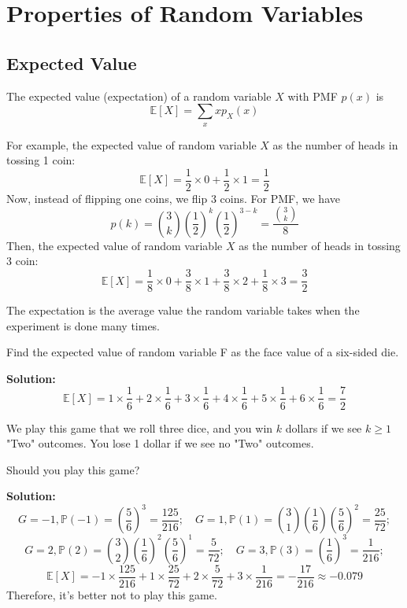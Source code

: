 \section{Properties of Random Variables}

\subsection{Expected Value}
\begin{definition}
  The expected value (expectation) of a random variable \(X\) with PMF \(p(x)\) is 
  \[
    \mathbb{E}[X] = \sum_{x} xp_X (x)
  \]
\end{definition}

For example, the expected value of random variable \(X\) as the number of heads in tossing 1 coin:
\[
  \mathbb{E}[X] = \dfrac{1}{2} \times 0 + \dfrac{1}{2} \times 1 = \dfrac{1}{2}
\]
Now, instead of flipping one coins, we flip 3 coins. For PMF, we have 
\[
  p(k) = \binom{3}{k} (\dfrac{1}{2})^k (\dfrac{1}{2})^{3-k} = \dfrac{\binom{3}{k}}{8}
\]
Then, the expected value of random variable \(X\) as the number of heads in tossing 3 coin:
\[
  \mathbb{E}[X] = \dfrac{1}{8} \times 0 + \dfrac{3}{8} \times 1 + \dfrac{3}{8} \times 2 + \dfrac{1}{8} \times 3 = \dfrac{3}{2}
\]

The expectation is the average value the random variable takes when the experiment is done many times.

\begin{eg}
  Find the expected value of random variable F as the face value of a six-sided die. 

  \textbf{Solution:} 
  \[
    \mathbb{E}[X] = 1 \times \dfrac{1}{6} + 2 \times \dfrac{1}{6} + 3 \times \dfrac{1}{6} + 4 \times \dfrac{1}{6} + 5 \times \dfrac{1}{6} + 6 \times \dfrac{1}{6} = \dfrac{7}{2}
  \]
\end{eg}

\begin{eg}
  We play this game that we roll three dice, and you win \(k\) dollars if we see \(k \geq 1\) "Two" outcomes. You lose 1 dollar if we see no "Two" outcomes.

  Should you play this game?

  \textbf{Solution:}
  \[
    G = -1, \mathbb{P}(-1) = (\dfrac{5}{6})^3 = \dfrac{125}{216};\quad G = 1, \mathbb{P}(1) = \binom{3}{1}(\dfrac{1}{6})(\dfrac{5}{6})^2 = \dfrac{25}{72};
  \]
  \[
    G = 2, \mathbb{P}(2) = \binom{3}{2}(\dfrac{1}{6})^2(\dfrac{5}{6})^1 = \dfrac{5}{72};\quad G = 3, \mathbb{P}(3) = (\dfrac{1}{6})^3 = \dfrac{1}{216};
  \]
  \[
    \mathbb{E}[X] = -1 \times \dfrac{125}{216} + 1 \times \dfrac{25}{72} + 2 \times \dfrac{5}{72} + 3 \times \dfrac{1}{216} = - \dfrac{17}{216} \approx -0.079
  \]
  Therefore, it’s better not to play this game. 
\end{eg}

